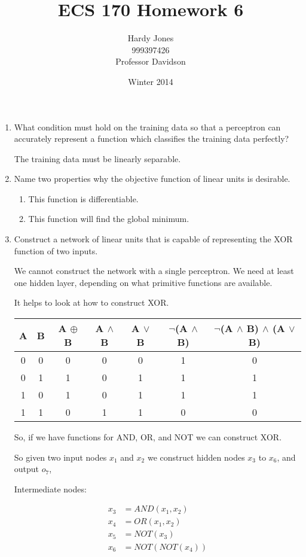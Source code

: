 \documentclass[12pt,letterpaper]{article}
\title{ECS 170 Homework 6\vspace{-2ex}}
\author{Hardy Jones\\
        999397426\\
        Professor Davidson\vspace{-2ex}}
\date{Winter 2014}
\begin{document}
  \maketitle

  \begin{enumerate}
    \item
    What condition must hold on the training data so that a perceptron
    can accurately represent a function which classifies the training data perfectly?

    The training data must be linearly separable.

    \item Name two properties why the objective function of linear units is desirable.

    \begin{enumerate}
      \item This function is differentiable.
      \item This function will find the global minimum.
    \end{enumerate}

    \item Construct a network of linear units that is capable of representing the XOR function of two inputs.

      We cannot construct the network with a single perceptron.
      We need at least one hidden layer,
      depending on what primitive functions are available.

      It helps to look at how to construct XOR.

      \begin{tabular}{c | c | c | c | c | c | c}
       A & B & A $\oplus$ B & A $\land$ B & A $\lor$ B & $\neg$(A $\land$ B) & $\neg$(A $\land$ B) $\land$ (A $\lor$ B) \\
       \hline
       0 & 0 & 0 & 0 & 0 & 1 & 0 \\
       0 & 1 & 1 & 0 & 1 & 1 & 1 \\
       1 & 0 & 1 & 0 & 1 & 1 & 1 \\
       1 & 1 & 0 & 1 & 1 & 0 & 0
      \end{tabular}

      So, if we have functions for AND, OR, and NOT we can construct XOR.

      So given two input nodes $x_1$ and $x_2$ we construct hidden nodes $x_3$ to $x_6$, and output $o_7$,

      Intermediate nodes:

      \begin{align*}
        x_3 &= AND(x_1, x_2) \\
        x_4 &= OR(x_1, x_2) \\
        x_5 &= NOT(x_3) \\
        x_6 &= NOT(NOT(x_4)) \tag{*}\label{q3:id} \\
      \end{align*}


\end{enumerate}
\end{document}
